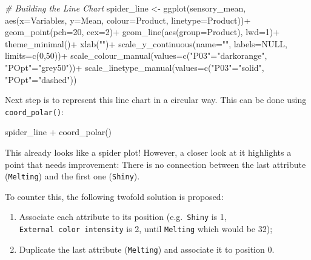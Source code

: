 \documentclass[
]{book}
\newenvironment{Shaded}{\begin{snugshade}}{\end{snugshade}}
\newcommand{\AttributeTok}[1]{\textcolor[rgb]{0.77,0.63,0.00}{#1}}
\newcommand{\CommentTok}[1]{\textcolor[rgb]{0.56,0.35,0.01}{\textit{#1}}}
\newcommand{\ConstantTok}[1]{\textcolor[rgb]{0.00,0.00,0.00}{#1}}
\newcommand{\DecValTok}[1]{\textcolor[rgb]{0.00,0.00,0.81}{#1}}
\newcommand{\FunctionTok}[1]{\textcolor[rgb]{0.00,0.00,0.00}{#1}}
\newcommand{\NormalTok}[1]{#1}
\newcommand{\OtherTok}[1]{\textcolor[rgb]{0.56,0.35,0.01}{#1}}
\newcommand{\SpecialCharTok}[1]{\textcolor[rgb]{0.00,0.00,0.00}{#1}}
\newcommand{\StringTok}[1]{\textcolor[rgb]{0.31,0.60,0.02}{#1}}
\providecommand{\tightlist}{%
  \setlength{\itemsep}{0pt}\setlength{\parskip}{0pt}}
\begin{document}
\begin{Shaded}
\begin{Highlighting}[]
\CommentTok{\# Building the Line Chart}
\NormalTok{spider\_line }\OtherTok{\textless{}{-}} \FunctionTok{ggplot}\NormalTok{(sensory\_mean, }\FunctionTok{aes}\NormalTok{(}\AttributeTok{x=}\NormalTok{Variables, }\AttributeTok{y=}\NormalTok{Mean, }\AttributeTok{colour=}\NormalTok{Product, }\AttributeTok{linetype=}\NormalTok{Product))}\SpecialCharTok{+}
  \FunctionTok{geom\_point}\NormalTok{(}\AttributeTok{pch=}\DecValTok{20}\NormalTok{, }\AttributeTok{cex=}\DecValTok{2}\NormalTok{)}\SpecialCharTok{+}
  \FunctionTok{geom\_line}\NormalTok{(}\FunctionTok{aes}\NormalTok{(}\AttributeTok{group=}\NormalTok{Product), }\AttributeTok{lwd=}\DecValTok{1}\NormalTok{)}\SpecialCharTok{+}
  \FunctionTok{theme\_minimal}\NormalTok{()}\SpecialCharTok{+}
  \FunctionTok{xlab}\NormalTok{(}\StringTok{""}\NormalTok{)}\SpecialCharTok{+}
  \FunctionTok{scale\_y\_continuous}\NormalTok{(}\AttributeTok{name=}\StringTok{""}\NormalTok{, }\AttributeTok{labels=}\ConstantTok{NULL}\NormalTok{, }\AttributeTok{limits=}\FunctionTok{c}\NormalTok{(}\DecValTok{0}\NormalTok{,}\DecValTok{50}\NormalTok{))}\SpecialCharTok{+}
  \FunctionTok{scale\_colour\_manual}\NormalTok{(}\AttributeTok{values=}\FunctionTok{c}\NormalTok{(}\StringTok{"P03"}\OtherTok{=}\StringTok{"darkorange"}\NormalTok{, }\StringTok{"POpt"}\OtherTok{=}\StringTok{"grey50"}\NormalTok{))}\SpecialCharTok{+}
  \FunctionTok{scale\_linetype\_manual}\NormalTok{(}\AttributeTok{values=}\FunctionTok{c}\NormalTok{(}\StringTok{"P03"}\OtherTok{=}\StringTok{"solid"}\NormalTok{, }\StringTok{"POpt"}\OtherTok{=}\StringTok{"dashed"}\NormalTok{))}
\end{Highlighting}
\end{Shaded}

Next step is to represent this line chart in a circular way. This can be done using \texttt{coord\_polar()}:

\begin{Shaded}
\begin{Highlighting}[]
\NormalTok{spider\_line }\SpecialCharTok{+} \FunctionTok{coord\_polar}\NormalTok{()}
\end{Highlighting}
\end{Shaded}

This already looks like a spider plot! However, a closer look at it highlights a point that needs improvement: There is no connection between the last attribute (\texttt{Melting}) and the first one (\texttt{Shiny}).

To counter this, the following twofold solution is proposed:

\begin{enumerate}
\def\labelenumi{\arabic{enumi}.}
\tightlist
\item
  Associate each attribute to its position (e.g.~\texttt{Shiny} is 1, \texttt{External\ color\ intensity} is 2, until \texttt{Melting} which would be 32);
\item
  Duplicate the last attribute (\texttt{Melting}) and associate it to position 0.
\end{enumerate}
\end{document}
